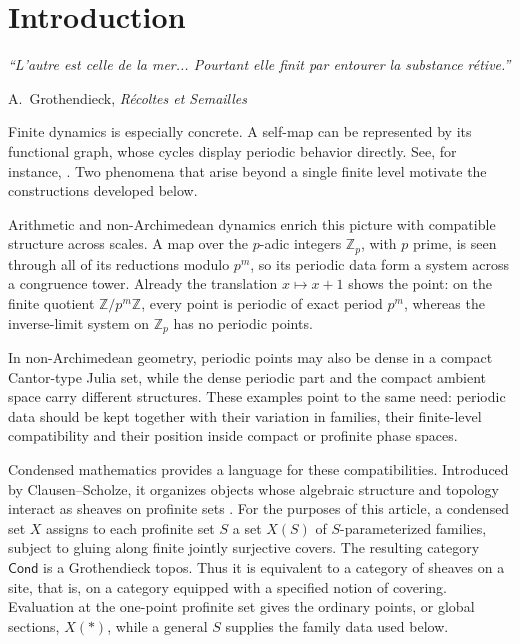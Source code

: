 \documentclass[10pt]{amsart}
\newcommand{\Cond}{\mathsf{Cond}}
\newcommand{\Z}{\mathbb{Z}}
\newcommand{\Zp}{\mathbb{Z}_p}
\theoremstyle{plain}
\theoremstyle{definition}
\begin{document}
\section{Introduction}
\label{sec:intro}

\begin{center}
\begin{minipage}{0.72\textwidth}
\small\itshape
``L'autre est celle de la mer... Pourtant elle finit par entourer la
substance r\'etive.''

\hfill A.~Grothendieck, \emph{R\'ecoltes et Semailles}
\end{minipage}
\end{center}

Finite dynamics is especially concrete. A self-map can be represented by its
functional graph, whose cycles display periodic behavior directly. See, for
instance, \cite{MitchellMukherjeeVojtechovskyEndofunctions}. Two phenomena that
arise beyond a single finite level motivate the constructions developed below.

Arithmetic and non-Archimedean dynamics enrich this picture with compatible
structure across scales. A map over the \(p\)-adic integers \(\Zp\), with
\(p\) prime, is seen through all of its reductions modulo \(p^m\), so its
periodic data form a system across a congruence tower. Already the translation
\(x\mapsto x+1\) shows the point: on the finite quotient
\(\Z/p^m\Z\), every point is periodic of exact period \(p^m\), whereas the
inverse-limit system on \(\Zp\) has no periodic points.

In non-Archimedean geometry, periodic points may also be dense in a compact
Cantor-type Julia set, while the dense periodic part and the compact ambient
space carry different structures. These examples point to the same need:
periodic data should be kept together with their variation in families, their
finite-level compatibility and their position inside compact or profinite phase
spaces.

Condensed mathematics provides a language for these compatibilities.
Introduced by Clausen--Scholze, it organizes objects whose algebraic structure
and topology interact as sheaves on profinite sets
\cite{ClausenScholze,LeStumCondensed}. For the purposes of this article, a
condensed set \(X\) assigns to each profinite set \(S\) a set \(X(S)\) of
\(S\)-parameterized families, subject to gluing along finite jointly surjective
covers. The resulting category \(\Cond\) is a Grothendieck topos. Thus it is
equivalent to a category of sheaves on a site, that is, on a category equipped
with a specified notion of covering. Evaluation at the one-point profinite set
gives the ordinary points, or global sections, \(X(*)\), while a general \(S\)
supplies the family data used below.
\end{document}
